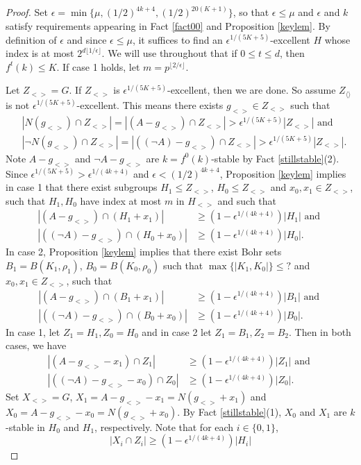 \documentclass[11pt]{article}
\theoremstyle{definition}
\begin{document}
\begin{proof}
Set $\epsilon=\min\{\mu, (1/2)^{4k+4}, (1/2)^{20(K+1)}\}$, so that $\epsilon\leq \mu$ and $\epsilon$ and $k$ satisfy requirements appearing in Fact \ref{fact00} and Proposition \ref{keylem}.  By definition of $\epsilon$ and since $\epsilon \leq \mu$, it suffices to find an $\epsilon^{1/(5K+5)}$-excellent $H$ whose index is at most $2^{d\lfloor 1/\epsilon\rfloor}$. We will use throughout that if $0\leq t\leq d$, then $f^t(k)\leq K$.  If case 1 holds, let $m=p^{\lfloor 2/\epsilon \rfloor}$.  

Let $Z_{<>}=G$.  If $Z_{<>}$ is $\epsilon^{1/(5K+5)}$-excellent, then we are done.  So assume $Z_{\langle \rangle}$ is not $\epsilon^{1/(5K+5)}$-excellent.  This means there exists $g_{<>}\in Z_{<>}$ such that
\begin{align*}
&|N(g_{<>})\cap Z_{<>}|=|(A-g_{<>})\cap Z_{<>}|> \epsilon^{1/(5K+5)} |Z_{<>}|\text{ and }\\
&|\neg N(g_{<>})\cap Z_{<>}|=|((\neg A)-g_{<>})\cap Z_{<>}|> \epsilon^{1/(5K+5)} |Z_{<>}|.
\end{align*}
Note $A-g_{<>}$ and $\neg A-g_{<>}$ are $k=f^0(k)$-stable by Fact \ref{stillstable}(2).  Since $\epsilon^{1/(5K+5)}>\epsilon^{1/(4k+4)}$ and $\epsilon<(1/2)^{4k+4}$, Proposition \ref{keylem} implies in case 1 that there exist subgroups $H_{1}\leq Z_{<>}$, $H_{0}\leq Z_{<>}$ and $x_{0}, x_{1}\in Z_{<>}$, such that $H_{1},H_{0}$ have index at most $m$ in $H_{<>}$ and such that 
\begin{align*}
|(A-g_{<>})\cap (H_{1}+x_{1})|&\geq (1-\epsilon^{1/(4k+4)})|H_{1}|\text{ and }\\
|((\neg A)-g_{<>})\cap (H_{0}+x_{0})|&\geq (1-\epsilon^{1/(4k+4)})|H_{0}|.
\end{align*}
In case 2, Proposition \ref{keylem} implies that there exist Bohr sets $B_{1}=B(K_1,\rho_1)$, $B_{0}=B(K_0, \rho_0)$ such that $\max\{|K_1,K_0|\}\leq ?$ and $x_{0}, x_{1}\in Z_{<>}$, such that 
\begin{align*}
|(A-g_{<>})\cap (B_{1}+x_{1})|&\geq (1-\epsilon^{1/(4k+4)})|B_{1}|\text{ and }\\
|((\neg A)-g_{<>})\cap (B_{0}+x_{0})|&\geq (1-\epsilon^{1/(4k+4)})|B_{0}|.
\end{align*}
In case 1, let $Z_1=H_1,Z_0=H_0$ and in case 2 let $Z_1=B_1,Z_2=B_2$.  Then in both cases, we have 
\begin{align*}
|(A-g_{<>}-x_{1})\cap Z_{1}|&\geq (1-\epsilon^{1/(4k+4)})|Z_{1}|\text{ and }\\
|((\neg A)-g_{<>}-x_{0})\cap Z_{0}|&\geq (1-\epsilon^{1/(4k+4)})|Z_{0}|.
\end{align*}
Set $X_{<>}=G$, $X_1=A-g_{<>}-x_1=N(g_{<>}+x_1)$ and $X_0=A-g_{<>}-x_0=N(g_{<>}+x_0)$.  By Fact \ref{stillstable}(1), $X_0$ and $X_1$ are $k$-stable in $H_0$ and $H_1$, respectively. Note that for each $i\in \{0,1\}$, 
$$
|X_i\cap Z_i|\geq (1-\epsilon^{1/(4k+4)})|H_i|
$$




\end{proof}
\end{document}
